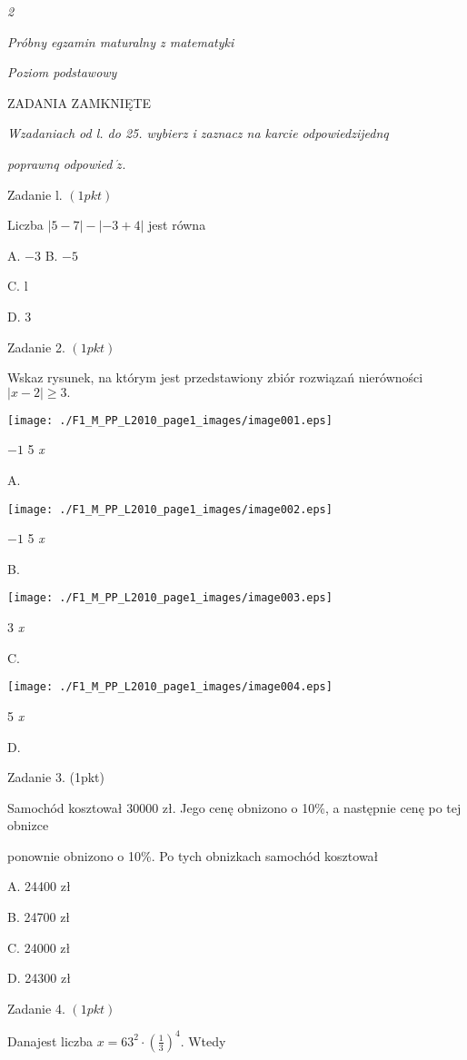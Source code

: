 \documentclass[a4paper,12pt]{article}
\begin{document}
{\it 2}

{\it Próbny egzamin maturalny z matematyki}

{\it Poziom podstawowy}

ZADANIA ZAMKNIĘTE

{\it Wzadaniach od l. do 25. wybierz i zaznacz na karcie odpowiedzijednq}

{\it poprawnq odpowied} $\acute{z}.$

Zadanie l. $(1pkt)$

Liczba $|5-7|-|-3+4|$ jest równa

A. $-3$ B. $-5$

C. l

D. 3

Zadanie 2. $(1pkt)$

Wskaz rysunek, na którym jest przedstawiony zbiór rozwiązań nierówności $|x-2|\geq 3.$
\begin{center}
\texttt{[image: ./F1\_M\_PP\_L2010\_page1\_images/image001.eps]}
\end{center}
$-1$  5  {\it x}

A.
\begin{center}
\texttt{[image: ./F1\_M\_PP\_L2010\_page1\_images/image002.eps]}
\end{center}
$-1$  5  {\it x}

B.
\begin{center}
\texttt{[image: ./F1\_M\_PP\_L2010\_page1\_images/image003.eps]}
\end{center}
3  {\it x}

C.
\begin{center}
\texttt{[image: ./F1\_M\_PP\_L2010\_page1\_images/image004.eps]}
\end{center}
5  {\it x}

D.

Zadanie 3. (1pkt)

Samochód kosztował 30000 zł. Jego cenę obnizono o 10\%, a następnie cenę po tej obnizce

ponownie obnizono o 10\%. Po tych obnizkach samochód kosztował

A. 24400 zł

B. 24700 zł

C. 24000 zł

D. 24300 zł

Zadanie 4. $(1pkt)$

Danajest liczba $x=63^{2}\displaystyle \cdot(\frac{1}{3})^{4}$. Wtedy
\end{document}
